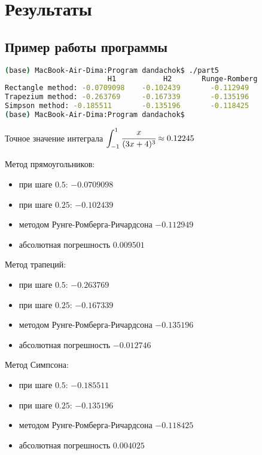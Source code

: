 \section*{Результаты}

\subsection*{Пример работы программы}

\begin{lstlisting}[language=bash]
(base) MacBook-Air-Dima:Program dandachok$ ./part5
                        H1           H2       Runge-Romberg
Rectangle method: -0.0709098    -0.102439       -0.112949
Trapezium method: -0.263769     -0.167339       -0.135196
Simpson method: -0.185511       -0.135196       -0.118425
(base) MacBook-Air-Dima:Program dandachok$
\end{lstlisting}

Точное значение интеграла
$\displaystyle\int_{-1}^{1} \cfrac{x}{(3x+4)^3}\approx 0.12245$

Метод прямоугольников:

\begin{itemize}
    \item при шаге $0.5$: $-0.0709098$
    \item при шаге $0.25$: $-0.102439$
    \item методом Рунге-Ромберга-Ричардсона $-0.112949$
    \item абсолютная погрешность $0.009501$
\end{itemize}

Метод трапеций:

\begin{itemize}
    \item при шаге $0.5$: $-0.263769$
    \item при шаге $0.25$: $-0.167339$
    \item методом Рунге-Ромберга-Ричардсона $-0.135196$
    \item абсолютная погрешность $-0.012746$
\end{itemize}

Метод Симпсона:

\begin{itemize}
    \item при шаге $0.5$: $-0.185511$
    \item при шаге $0.25$: $-0.135196$
    \item методом Рунге-Ромберга-Ричардсона $-0.118425$
    \item абсолютная погрешность $0.004025$
\end{itemize}

\pagebreak